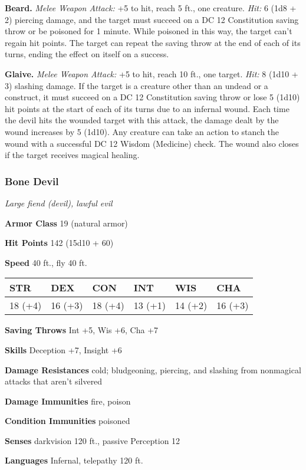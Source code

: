 \documentclass[
]{article}
\begin{document}
\textbf{Beard.} \emph{Melee Weapon Attack:} +5 to hit, reach 5 ft., one
creature. \emph{Hit:} 6 (1d8 + 2) piercing damage, and the target must
succeed on a DC 12 Constitution saving throw or be poisoned for 1
minute. While poisoned in this way, the target can't regain hit points.
The target can repeat the saving throw at the end of each of its turns,
ending the effect on itself on a success.

\textbf{Glaive.} \emph{Melee Weapon Attack:} +5 to hit, reach 10 ft.,
one target. \emph{Hit:} 8 (1d10 + 3) slashing damage. If the target is a
creature other than an undead or a construct, it must succeed on a DC 12
Constitution saving throw or lose 5 (1d10) hit points at the start of
each of its turns due to an infernal wound. Each time the devil hits the
wounded target with this attack, the damage dealt by the wound increases
by 5 (1d10). Any creature can take an action to stanch the wound with a
successful DC 12 Wisdom (Medicine) check. The wound also closes if the
target receives magical healing.

\hypertarget{bone-devil}{%
\subsubsection{Bone Devil}\label{bone-devil}}

\emph{Large fiend (devil), lawful evil}

\textbf{Armor Class} 19 (natural armor)

\textbf{Hit Points} 142 (15d10 + 60)

\textbf{Speed} 40 ft., fly 40 ft.

\begin{longtable}[]{@{}llllll@{}}
\toprule
STR & DEX & CON & INT & WIS & CHA\tabularnewline
\midrule
\endhead
18 (+4) & 16 (+3) & 18 (+4) & 13 (+1) & 14 (+2) & 16 (+3)\tabularnewline
\bottomrule
\end{longtable}

\textbf{Saving Throws} Int +5, Wis +6, Cha +7

\textbf{Skills} Deception +7, Insight +6

\textbf{Damage Resistances} cold; bludgeoning, piercing, and slashing
from nonmagical attacks that aren't silvered

\textbf{Damage Immunities} fire, poison

\textbf{Condition Immunities} poisoned

\textbf{Senses} darkvision 120 ft., passive Perception 12

\textbf{Languages} Infernal, telepathy 120 ft.
\end{document}
